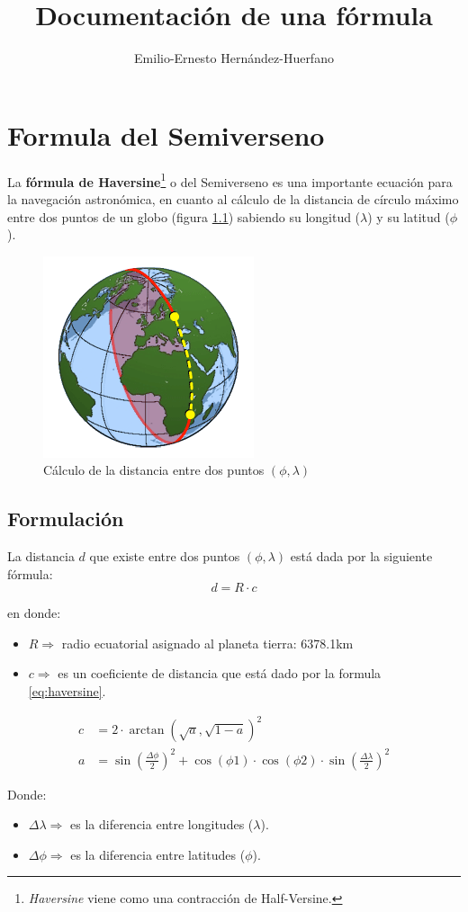 \documentclass[12pt,letterpaper,oneside]{book}
\title{Documentación de una fórmula}
\author{Emilio-Ernesto Hernández-Huerfano}
\begin{document}
\maketitle
\chapter{Formula del Semiverseno}
\noindent La \textbf{fórmula de Haversine}\footnote{\textit{Haversine} viene como una contracción de Half-Versine.} o del Semiverseno es una importante ecuación para la navegación astronómica, en cuanto al cálculo de la distancia de círculo máximo entre dos puntos de un globo (figura \ref{fig:haversine}) sabiendo su longitud ($\lambda$) y su latitud ($\phi$).


\begin{figure}[h]
\centering
\includegraphics[scale=.8]{img/haversine.png}
\caption{Cálculo de la distancia entre dos puntos $(\phi, \lambda)$}
\label{fig:haversine}
\end{figure}


\section{Formulación}
La distancia $d$ que existe entre dos puntos $(\phi, \lambda)$ está dada por la siguiente fórmula:$$d=R \cdot c$$

en donde:
\begin{itemize}
\item $R \Rightarrow$  radio ecuatorial asignado al planeta tierra: 6378.1km
\item $c \Rightarrow$ es un coeficiente de distancia que está dado por la formula \ref{eq:haversine}.
\end{itemize}

\begin{equation} \label{eq:haversine}
\begin{split}
c & = 2 \cdot \arctan (\sqrt{a} ,\sqrt{1-a} )^{2} \\
a & = \sin(\frac{\Delta\phi}{2})^{2} + \cos(\phi 1) \cdot \cos(\phi 2) \cdot \sin(\frac{\Delta\lambda}{2})^{2} 
\end{split}
\end{equation}

Donde:
\begin{itemize}
\item $\Delta\lambda \Rightarrow$ es la diferencia entre longitudes ($\lambda$).
\item $\Delta\phi \Rightarrow$ es la diferencia entre latitudes ($\phi$).
\end{itemize}
\end{document}
